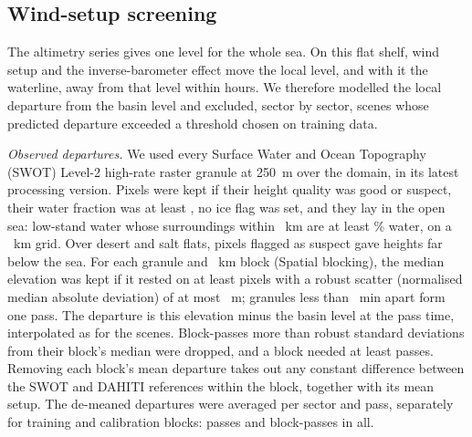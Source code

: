 
\subsection*{Wind-setup screening}
The altimetry series gives one level for the whole sea. On this flat shelf, wind setup and the inverse-barometer effect move the local level, and with it the waterline, away from that level within hours. We therefore modelled the local departure from the basin level and excluded, sector by sector, scenes whose predicted departure exceeded a threshold chosen on training data.

\emph{Observed departures.} We used every Surface Water and Ocean Topography (SWOT) Level-2 high-rate raster granule at 250~m over the domain, in its latest processing version. Pixels were kept if their height quality was good or suspect, their water fraction was at least , no ice flag was set, and they lay in the open sea:  low-stand water whose surroundings within ~km are at least \% water, on a ~km grid. Over desert and salt flats, pixels flagged as suspect gave heights far below the sea. For each granule and ~km block (Spatial blocking), the median elevation was kept if it rested on at least  pixels with a robust scatter (normalised median absolute deviation) of at most ~m; granules less than ~min apart form one pass. The departure is this elevation minus the basin level at the pass time, interpolated as for the scenes. Block-passes more than  robust standard deviations from their block's median were dropped, and a block needed at least  passes. Removing each block's mean departure takes out any constant difference between the SWOT and DAHITI references within the block, together with its mean setup. The de-meaned departures were averaged per sector and pass, separately for training and calibration blocks:  passes and  block-passes in all.

